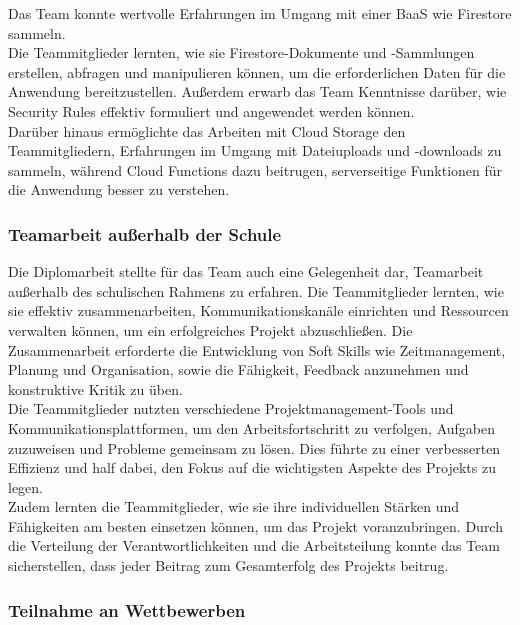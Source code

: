 Das Team konnte wertvolle Erfahrungen im Umgang mit einer BaaS wie Firestore sammeln.
\\
Die Teammitglieder lernten, wie sie Firestore-Dokumente und -Sammlungen erstellen, abfragen und manipulieren können, um die erforderlichen Daten für die Anwendung bereitzustellen. Außerdem erwarb das Team Kenntnisse darüber, wie Security Rules effektiv formuliert und angewendet werden können.
\\
Darüber hinaus ermöglichte das Arbeiten mit Cloud Storage den Teammitgliedern, Erfahrungen im Umgang mit Dateiuploads und -downloads zu sammeln, während Cloud Functions dazu beitrugen, serverseitige Funktionen für die Anwendung besser zu verstehen.

\subsubsection{Teamarbeit außerhalb der Schule}

Die Diplomarbeit stellte für das Team auch eine Gelegenheit dar, Teamarbeit außerhalb des schulischen Rahmens zu erfahren. Die Teammitglieder lernten, wie sie effektiv zusammenarbeiten, Kommunikationskanäle einrichten und Ressourcen verwalten können, um ein erfolgreiches Projekt abzuschließen. Die Zusammenarbeit erforderte die Entwicklung von Soft Skills wie Zeitmanagement, Planung und Organisation, sowie die Fähigkeit, Feedback anzunehmen und konstruktive Kritik zu üben.
\\
Die Teammitglieder nutzten verschiedene Projektmanagement-Tools und Kommunikationsplattformen, um den Arbeitsfortschritt zu verfolgen, Aufgaben zuzuweisen und Probleme gemeinsam zu lösen. Dies führte zu einer verbesserten Effizienz und half dabei, den Fokus auf die wichtigsten Aspekte des Projekts zu legen.
\\
Zudem lernten die Teammitglieder, wie sie ihre individuellen Stärken und Fähigkeiten am besten einsetzen können, um das Projekt voranzubringen. Durch die Verteilung der Verantwortlichkeiten und die Arbeitsteilung konnte das Team sicherstellen, dass jeder Beitrag zum Gesamterfolg des Projekts beitrug.

\subsubsection{Teilnahme an Wettbewerben}

